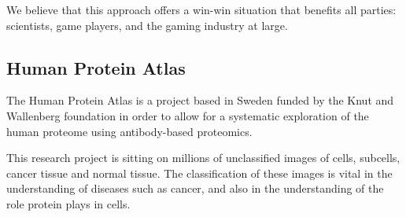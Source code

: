 	We believe that this approach offers a win-win situation that benefits all parties: scientists, game players, and the gaming industry at large. 

\subsection{Human Protein Atlas}
	The Human Protein Atlas is a project based in Sweden funded by the Knut and Wallenberg foundation in order to allow for a systematic exploration of the human proteome using antibody-based proteomics. %

	This research project is sitting on millions of unclassified images of cells, subcells, cancer tissue and normal tissue. The classification of these images is vital in the understanding of diseases such as cancer, and also in the understanding of the role protein plays in cells.

